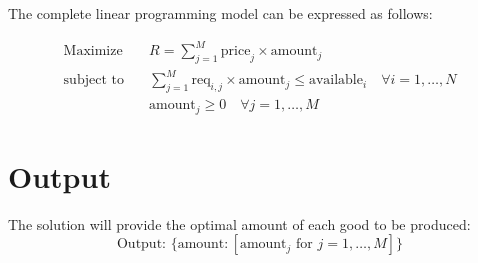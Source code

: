 \documentclass{article}
\begin{document}
The complete linear programming model can be expressed as follows:

\begin{align*}
\text{Maximize} \quad & R = \sum_{j=1}^{M} \text{price}_{j} \times \text{amount}_{j} \\
\text{subject to} \quad & \sum_{j=1}^{M} \text{req}_{i,j} \times \text{amount}_{j} \leq \text{available}_{i} \quad \forall i = 1, \ldots, N \\
& \text{amount}_{j} \geq 0 \quad \forall j = 1, \ldots, M
\end{align*}

\section*{Output}

The solution will provide the optimal amount of each good to be produced:
\[
\text{Output: } \{\text{amount}: [\text{amount}_{j} \text{ for } j = 1, \ldots, M]\}
\]
\end{document}

